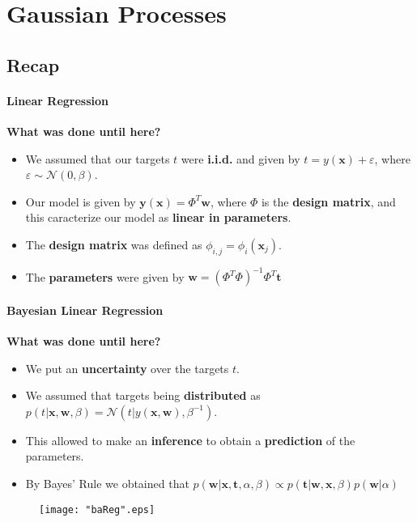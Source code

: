 \section{Gaussian Processes}
\framecard{\insertsection}

\subsection{Recap}
\begin{frame}{\insertsubsection}
    \framesubtitle{Linear Regression} 

    \textcolor{UniGold}{\textbf{What was done until here?}}
    \begin{itemize}
        \item We assumed that our targets $t$ were \textcolor{UniOrange}{\textbf{i.i.d.}} and given by $t = y(\mathbf{x}) + \varepsilon$, where $\varepsilon \sim \mathcal{N}(0,\beta)$.
        \item Our model is given by $\mathbf{y}(\mathbf{x}) = \Phi^T \mathbf{w}$, where $\Phi$ is the \textcolor{UniOrange}{\textbf{design matrix}}, and this caracterize our model as \textcolor{UniOrange}{\textbf{linear in parameters}}.
        \item The \textcolor{UniOrange}{\textbf{design matrix}} was defined as $ \phi_{i,j} = \phi_i(\mathbf{x}_j)$.
        \item The \textcolor{UniOrange}{\textbf{parameters}} were given by $\mathbf{w} = \left( \Phi^T \Phi \right)^{-1}\Phi^T \mathbf{t} $
    \end{itemize}
    

\end{frame}

\begin{frame}{\insertsubsection}
    \framesubtitle{Bayesian Linear Regression} 

    \textcolor{UniGold}{\textbf{What was done until here?}}
    \begin{itemize}
        \item We put an \textcolor{UniOrange}{\textbf{uncertainty}} over the targets $t$.
        \item We assumed that targets being \textcolor{UniOrange}{\textbf{distributed}} as $p( t| \mathbf{x}, \mathbf{w}, \beta) = \mathcal{N} ( t | y(\mathbf{x}, \mathbf{w}), \beta^{-1})$.
        \item This allowed to make an \textcolor{UniOrange}{\textbf{inference}} to obtain a \textcolor{UniOrange}{\textbf{prediction}} of the parameters.
        \item By Bayes' Rule we obtained that $p\left( \mathbf{w} | \mathbf{x}, \mathbf{t}, \alpha, \beta \right) \propto p\left(  \mathbf{t} |\mathbf{w} ,\mathbf{x}, \beta \right) p\left( \mathbf{w} | \alpha \right)$
    \end{itemize}

    \begin{figure}
		\label{fig:baReg}
        \hspace*{-1.4cm}\texttt{[image: "baReg".eps]}
		\end{figure}

\end{frame}